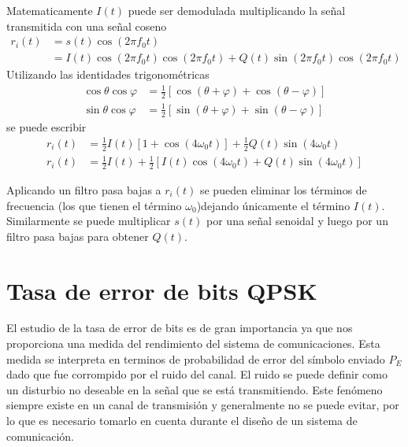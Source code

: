 Matematicamente $I(t)$ puede ser demodulada multiplicando la se\~nal transmitida
con una se\~nal coseno
\begin{equation}
\begin{aligned}
r_i(t)&=s(t)\cos(2\pi f_0t)\\
&=I(t)\cos(2\pi f_0t)\cos(2\pi f_0t)+Q(t)\sin(2\pi f_0t)\cos(2\pi f_0t)
\end{aligned}
\end{equation}
Utilizando las identidades trigonom\'etricas
\begin{equation}
\begin{aligned}
\cos\theta\cos\varphi&=\frac{1}{2}[\cos(\theta+\varphi)+\cos(\theta-\varphi)]\\
\sin\theta\cos\varphi&=\frac{1}{2}[\sin(\theta+\varphi)+\sin(\theta-\varphi)]
\end{aligned}
\end{equation}
se puede escribir
\begin{equation}
\begin{aligned}
r_i(t)&=\frac{1}{2}I(t)[1+\cos(4\omega_0t)]+\frac{1}{2}Q(t)\sin(4\omega_0t)\\
r_i(t)&=\frac{1}{2}I(t)+\frac{1}{2}[I(t)\cos(4\omega_0t)+Q(t)\sin(4\omega_0t)]
\end{aligned}
\end{equation}

Aplicando un filtro pasa bajas a $r_i(t)$ se pueden eliminar los t\'erminos de
frecuencia (los que tienen el t\'ermino $\omega_0$)dejando \'unicamente el
t\'ermino $I(t)$. Similarmente se puede multiplicar $s(t)$ por una se\~nal
senoidal y luego por un filtro pasa bajas para obtener $Q(t)$.

\section{Tasa de error de bits QPSK}
El estudio de la tasa de error de bits es de gran importancia ya que nos proporciona una medida del
rendimiento del sistema de comunicaciones. Esta medida se interpreta en terminos de probabilidad de
error del s\'imbolo enviado $P_E$ dado que fue corrompido por el ruido del canal. El ruido se puede
definir como un disturbio no deseable en la se\~nal que se est\'a transmitiendo. Este fen\'omeno
siempre existe en un canal de transmisi\'on y generalmente no se puede evitar, por lo que es
necesario tomarlo en cuenta durante el dise\~no de un sistema de comunicaci\'on.

